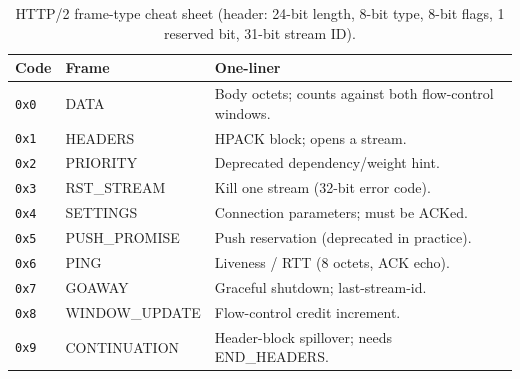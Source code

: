 \begin{table}[h]
  \centering
  \small
  \begin{tabularx}{\textwidth}{l l X}
    \toprule
    \textbf{Code} & \textbf{Frame} & \textbf{One-liner} \\
    \midrule
    \texttt{0x0} & DATA & Body octets; counts against both flow-control windows. \\
    \texttt{0x1} & HEADERS & HPACK block; opens a stream. \\
    \texttt{0x2} & PRIORITY & Deprecated dependency/weight hint. \\
    \texttt{0x3} & RST\_STREAM & Kill one stream (32-bit error code). \\
    \texttt{0x4} & SETTINGS & Connection parameters; must be ACKed. \\
    \texttt{0x5} & PUSH\_PROMISE & Push reservation (deprecated in practice). \\
    \texttt{0x6} & PING & Liveness / RTT (8 octets, ACK echo). \\
    \texttt{0x7} & GOAWAY & Graceful shutdown; last-stream-id. \\
    \texttt{0x8} & WINDOW\_UPDATE & Flow-control credit increment. \\
    \texttt{0x9} & CONTINUATION & Header-block spillover; needs END\_HEADERS. \\
    \bottomrule
  \end{tabularx}
  \caption{HTTP/2 frame-type cheat sheet (header: 24-bit length, 8-bit type, 8-bit flags, 1 reserved bit, 31-bit stream ID).}
\end{table}



